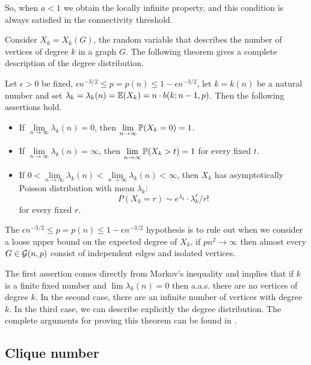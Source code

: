 So, when $a<1$ we obtain the locally infinite property, and this condition is always satisfied in the connectivity threshold.

Consider $X_{k} = X_{k} (G)$, the random variable that describes the number of vertices of degree $k$ in a graph $G$. The following theorem gives a complete description of the degree distribution. 

\begin{theorem}\label{degreeTheorem}
Let $\epsilon>0$ be fixed, $\epsilon n^{-3/2} \leq p = p(n) \leq 1 - \epsilon n^{-3/2}$, let $k = k(n)$ be a natural number and set $\lambda_{k} = \lambda_{k}(n) = \E(X_{k}) = n\cdot b(k;n - 1,p)$. Then the following assertions hold.

\begin{itemize}
\item If $\lim\limits_{n\to \infty} \lambda_{k}(n) = 0$, then $\lim\limits_{n\to \infty} \P(X_{k} = 0) = 1$. 
\item If $\lim\limits_{n\to \infty} \lambda_{k}(n) = \infty$, then $\lim\limits_{n\to \infty} \P(X_{k} > t) = 1$
for every fixed $t$.
\item If $0 < \lim\limits_{n\to \infty} \lambda_{k}(n) < \lim\limits_{n\to \infty} \lambda_{k}(n) < \infty$,
then $X_{k}$ has asymptotically Poisson distribution with mean $\lambda_{k}$: 
$$P(X_{k} = r) \sim e^{\lambda_{k}}\cdot \lambda_{k}^{r}/ r!$$
for every fixed $r$.
\end{itemize}
\end{theorem}

The $\epsilon n^{-3/2} \leq p = p(n) \leq 1 - \epsilon n^{-3/2}$ hypothesis is to rule out when we consider a loose upper bound on the expected degree of $X_ {k}$, if $pn^{2} \to \infty $ then almost every $ G \in \G (n, p) $ consist of independent edges and isolated vertices.

The first assertion comes directly from Markov's inequality and implies that if $k$ is a finite fixed number and $\lim \lambda_{k}(n) = 0$ then a.a.s. there are no vertices of degree $k$. In the second case, there are an infinite number of vertices with degree $k$. In the third case, we can describe explicitly the degree distribution. The complete arguments for proving this theorem can be found in \cite[Bollobás, p.~61]{Bollobas}.

\subsection{Clique number}


